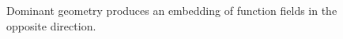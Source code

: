 \begin{figure}[htbp]\centering
{}
\caption{Dominant geometry produces an embedding of function fields in the opposite direction.}\label{fig:vi27-dominant}\end{figure}

